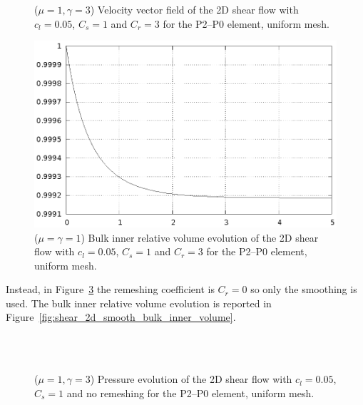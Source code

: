\documentclass[a4paper,12pt,onecolumn]{article}
\begin{document}
\begin{figure}[htbp]
  \centering
  \quad
  \\
  \quad
  \\
  \caption{($\mu=1,\gamma=3$) Velocity vector field of the 2D shear flow with $c_l=0.05$, $C_s=1$ and $C_r=3$ for the P2--P0 element, uniform mesh.}
  \label{fig:shear_2d_velocity}
\end{figure}

\begin{figure}[htbp]
  \centering
  \includegraphics[width=.45\textwidth]{figures/2d_shear_bulk_inner_volume.ps}
  \caption{($\mu=\gamma=1$) Bulk inner relative volume evolution of the 2D shear flow with $c_l=0.05$, $C_s=1$ and $C_r=3$ for the P2--P0 element, uniform mesh.}
  \label{fig:shear_2d_bulk_inner_volume}
\end{figure}

Instead, in Figure~\ref{fig:shear_2d_smooth} the remeshing coefficient is $C_r=0$ so only the smoothing is used. The bulk inner relative volume evolution is reported in Figure~\ref{fig:shear_2d_smooth_bulk_inner_volume}.
\begin{figure}[htbp]
  \centering
  \quad
  \\
  \quad
  \\
  \caption{($\mu=1,\gamma=3$) Pressure evolution of the 2D shear flow with $c_l=0.05$, $C_s=1$ and no remeshing for the P2--P0 element, uniform mesh.}
  \label{fig:shear_2d_smooth}
\end{figure}
\end{document}

